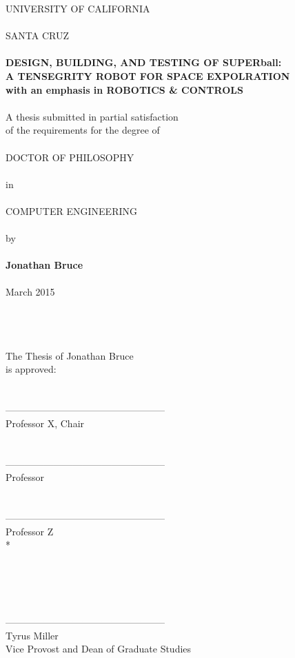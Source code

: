 \documentclass[11pt,oneside,a4paper,onecolumn]{article}                 %
\begin{document}


\thispagestyle{empty} %
\begin{center}
UNIVERSITY OF CALIFORNIA\\
\ \\
SANTA CRUZ\\
\ \\
{\bf DESIGN, BUILDING, AND TESTING OF SUPERball:\\ A TENSEGRITY ROBOT FOR SPACE EXPOLRATION}\\
{\bf with an emphasis in ROBOTICS \& CONTROLS}
\ \\
\ \\
A thesis submitted in partial satisfaction\\
of the requirements for the degree of\\
\ \\
DOCTOR OF PHILOSOPHY\\
\ \\
in\\
\ \\
COMPUTER ENGINEERING\\
\ \\
by\\
\ \\
{\bf Jonathan Bruce}\\
\ \\
March 2015\\
\ \\
\ \\
\ \\
\end{center}

{\addtolength{\leftskip}{76.2 mm} %
The Thesis of Jonathan Bruce\\
is approved:\\
\ \\
\ \\
--------------------------------------------------\\
Professor X, Chair\\
\ \\
\ \\
--------------------------------------------------\\
Professor\\
\ \\
\ \\
--------------------------------------------------\\
Professor Z\\*

}
\ \\
\ \\
\ \\
\ \\
--------------------------------------------------\\
Tyrus Miller\\
Vice Provost and Dean of Graduate Studies
\end{document}
